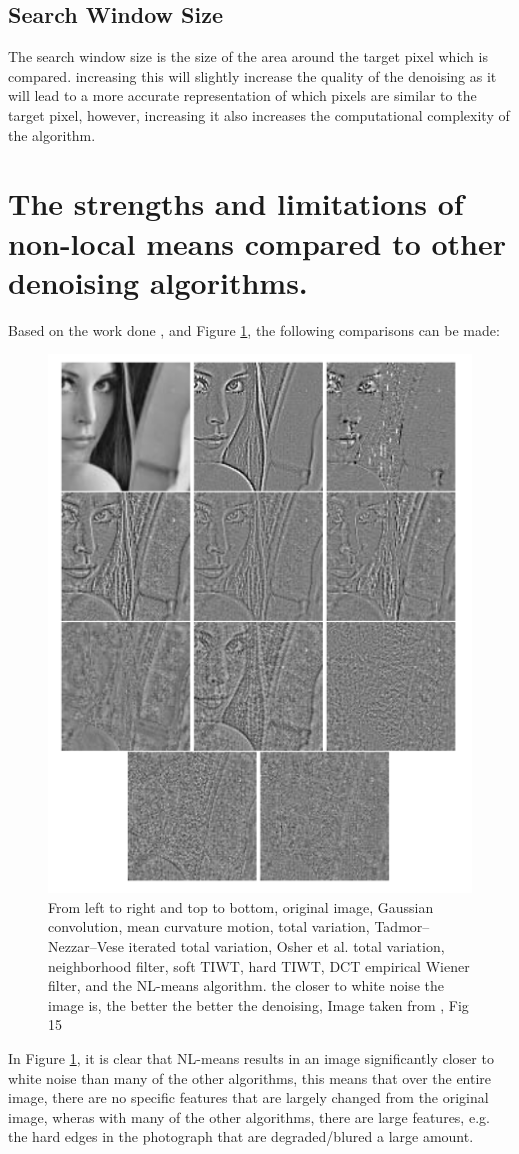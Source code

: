 \documentclass[11pt]{article}
\begin{document}
\subsection{Search Window Size}

The search window size is the size of the area around the target pixel which is compared. increasing this will slightly increase the quality of the denoising as it will lead to a more accurate representation of which pixels are similar to the target pixel, however, increasing it also increases the computational complexity of the algorithm.

\section{The strengths and limitations of non-local means compared to other denoising algorithms. }


Based on the work done \cite{Buades_2005}, and Figure \ref{fig:compare}, the following comparisons can be made:

\begin{figure}
    \centering
    \includegraphics[width=0.5\linewidth]{Images/compare.png}
    \caption{From left to right and top to bottom, original image, Gaussian convolution, mean curvature motion, total variation, Tadmor–Nezzar–Vese iterated total variation, Osher et al. total variation, neighborhood filter, soft TIWT, hard TIWT, DCT empirical Wiener filter, and the NL-means algorithm. the closer to white noise the image is, the better the better the denoising, Image taken from \cite{Buades_2005}, Fig 15} 
    \label{fig:compare}
\end{figure}

In Figure \ref{fig:compare}, it is clear that NL-means results in an image significantly closer to white noise than many of the other algorithms, this means that over the entire image, there are no specific features that are largely changed from the original image, wheras with many of the other algorithms, there are large features, e.g. the hard edges in the photograph that are degraded/blured a large amount.
\end{document}
